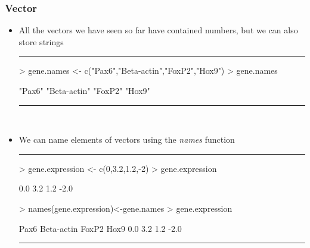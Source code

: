 \documentclass{beamer}
\begin{document}
\begin{frame}[fragile]
	\frametitle{Vector}
	\begin{itemize}
	  \item All the vectors we have seen so far have contained numbers, but we can also store strings 
\rule{\textwidth}{0.4pt}
\footnotesize
\begin{Schunk}
\begin{Sinput}
> gene.names <- c("Pax6","Beta-actin","FoxP2","Hox9")
> gene.names
\end{Sinput}
\begin{Soutput}
[1] "Pax6"       "Beta-actin" "FoxP2"      "Hox9"      
\end{Soutput}
\end{Schunk}
  \rule{\textwidth}{0.4pt}\\
  \vspace{20pt}
  \normalsize
	  \item We can name elements of vectors using the \textit{names} function
\rule{\textwidth}{0.4pt}
\footnotesize
\begin{Schunk}
\begin{Sinput}
> gene.expression <- c(0,3.2,1.2,-2)
> gene.expression
\end{Sinput}
\begin{Soutput}
[1]  0.0  3.2  1.2 -2.0
\end{Soutput}
\begin{Sinput}
> names(gene.expression)<-gene.names
> gene.expression
\end{Sinput}
\begin{Soutput}
      Pax6 Beta-actin      FoxP2       Hox9 
       0.0        3.2        1.2       -2.0 
\end{Soutput}
\end{Schunk}
  \rule{\textwidth}{0.4pt}\\
  \normalsize
	\end{itemize}
	
\end{frame}
\end{document}
